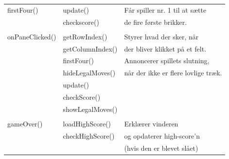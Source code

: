 \begin{table}[H]
\begin{tabular}{lll}
        firstFour()     & update()          & Får spiller nr. 1 til at sætte                                          \\
                        & checkscore()      & de fire første brikker.                                            \\
                        &                                                                                       \\

        onPaneClicked() & getRowIndex()     & Styrer hvad der sker, når                                         \\
                        & getColumnIndex()  & der bliver klikket på et felt.                                   \\
                        & firstFour()       & Annoncerer spillets slutning,                                        \\
                        & hideLegalMoves()  & når der ikke er flere lovlige træk.                                     \\
                        & update()               \\
                        & checkScore()           \\
                        & showLegalMoves()       \\
                        &                        \\

        gameOver()      & loadHighScore()   & Erklærer vinderen                                                 \\
                        & checkHighScore()  & og opdaterer high-score'n                                         \\
                        &                   & (hvis den er blevet slået)                                        \\
                

        \bottomrule
    \end{tabular}
\end{table}


